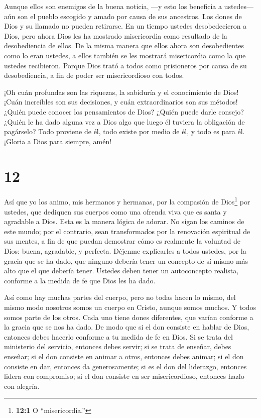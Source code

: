 Aunque ellos son enemigos de la buena noticia, ---y esto
los beneficia a ustedes---aún son el pueblo escogido y amado por causa
de sus ancestros.  Los dones de Dios y su llamado no pueden
retirarse.  En un tiempo ustedes desobedecieron a Dios,
pero ahora Dios les ha mostrado misericordia como resultado de la
desobediencia de ellos.  De la misma manera que ellos ahora
son desobedientes como lo eran ustedes, a ellos también se les mostrará
misericordia como la que ustedes recibieron.  Porque Dios
trató a todos como prisioneros por causa de su desobediencia, a fin de
poder ser misericordioso con todos.

 ¡Oh cuán profundas son las riquezas, la sabiduría y el
conocimiento de Dios! ¡Cuán increíbles son sus decisiones, y cuán
extraordinarios son sus métodos!  ¿Quién puede conocer los
pensamientos de Dios? ¿Quién puede darle consejo?  ¿Quién
le ha dado alguna vez a Dios algo que luego él tuviera la obligación de
pagárselo?  Todo proviene de él, todo existe por medio de
él, y todo es para él. ¡Gloria a Dios para siempre, amén!

\hypertarget{section-11}{%
\section{12}\label{section-11}}

 Así que yo los animo, mis hermanos y hermanas, por la
compasión de Dios\footnote{\textbf{12:1} O ``misericordia.''} por
ustedes, que dediquen sus cuerpos como una ofrenda viva que es santa y
agradable a Dios. Esta es la manera lógica de adorar.  No
sigan los caminos de este mundo; por el contrario, sean transformados
por la renovación espiritual de sus mentes, a fin de que puedan
demostrar cómo es realmente la voluntad de Dios: buena, agradable, y
perfecta.  Déjenme explicarles a todos ustedes, por la
gracia que se ha dado, que ninguno debería tener un concepto de sí mismo
más alto que el que debería tener. Ustedes deben tener un autoconcepto
realista, conforme a la medida de fe que Dios les ha dado.

 Así como hay muchas partes del cuerpo, pero no todas hacen
lo mismo,  del mismo modo nosotros somos un cuerpo en
Cristo, aunque somos muchos. Y todos somos parte de los otros.
 Cada uno tiene dones diferentes, que varían conforme a la
gracia que se nos ha dado. De modo que si el don consiste en hablar de
Dios, entonces debes hacerlo conforme a tu medida de fe en Dios.
 Si se trata del ministerio del servicio, entonces debes
servir; si se trata de enseñar, debes enseñar;  si el don
consiste en animar a otros, entonces debes animar; si el don consiste en
dar, entonces da generosamente; si es el don del liderazgo, entonces
lidera con compromiso; si el don consiste en ser misericordioso,
entonces hazlo con alegría.

